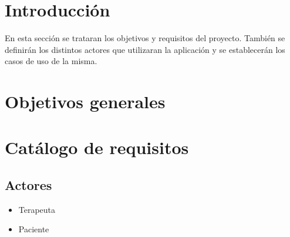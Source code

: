 
\section{Introducción}
En esta sección se trataran los objetivos y requisitos del proyecto. También se definirán los distintos actores que utilizaran la aplicación y se establecerán los  casos de uso de la misma.

\section{Objetivos generales}

\section{Catálogo de requisitos}
\subsection{Actores}
\begin{itemize}
	\item Terapeuta
	\item Paciente
\end{itemize} 


